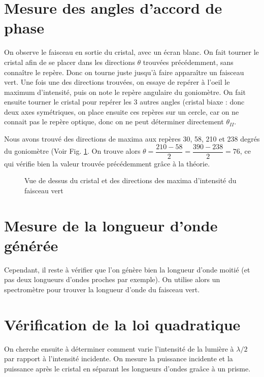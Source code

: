 \documentclass[a4paper,11pt]{report}
\begin{document}
\section{Mesure des angles d'accord de phase}
On observe le faisceau en sortie du cristal, avec un écran blanc. On fait tourner le cristal afin de se placer dans les directions $\theta$ trouvées précédemment, sans connaître le repère. Donc on tourne juste jusqu'à faire apparaître un faisceau vert. Une fois une des directions trouvées, on essaye de repérer à l'oeil le maximum d'intensité, puis on note le repère angulaire du goniomètre. On fait ensuite tourner le cristal pour repérer les 3 autres angles (cristal biaxe : donc deux axes symétriques, on place ensuite ces repères sur un cercle, car on ne connait pas le repère optique, donc on ne peut déterminer directement $\theta_{II}$.

Nous avons trouvé des directions de maxima aux repères 30, 58, 210 et 238 degrés du goniomètre (Voir Fig. \ref{anglesONL}. On trouve alors $\theta=\dfrac{210-58}{2}=\dfrac{390-238}{2}=76$\textdegree, ce qui vérifie bien la valeur trouvée précédemment grâce à la théorie.

\begin{figure}
    \centering
    \caption{Vue de dessus du cristal et des directions des maxima d'intensité du faisceau vert}
    \label{anglesONL}

\end{figure}

\section{Mesure de la longueur d'onde générée}
Cependant, il reste à vérifier que l'on génère bien la longueur d'onde moitié (et pas deux longueurs d'ondes proches par exemple). On utilise alors un spectromètre pour trouver la longueur d'onde du faisceau vert. 

\section{Vérification de la loi quadratique}
On cherche ensuite à déterminer comment varie l'intensité de la lumière à $\lambda/2$ par rapport à l'intensité incidente. On mesure la puissance incidente et la puissance après le cristal en séparant les longueurs d'ondes graâce à un prisme. 
\end{document}

